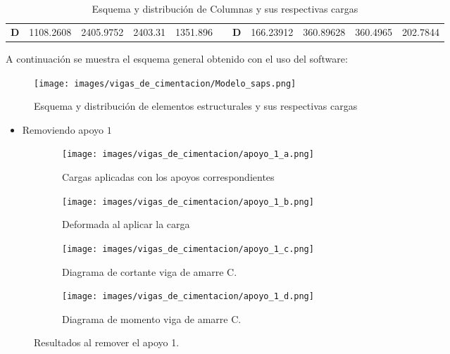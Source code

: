 \documentclass[12pt]{article}
\begin{document}
\begin{table}[H]
{\begin{tabular}{|c|r|r|r|r|r|c|r|r|r|r|}
\cline{1-5}\cline{7-11}    \rowcolor[rgb]{ 1,  .949,  .8} \textbf{D} & \cellcolor[rgb]{ 1,  1,  1}1108.2608 & \cellcolor[rgb]{ 1,  1,  1}2405.9752 & \cellcolor[rgb]{ 1,  1,  1}2403.31 & \cellcolor[rgb]{ 1,  1,  1}1351.896 & \cellcolor[rgb]{ 1,  1,  1} & \textbf{D} & \cellcolor[rgb]{ 1,  1,  1}166.23912 & \cellcolor[rgb]{ 1,  1,  1}360.89628 & \cellcolor[rgb]{ 1,  1,  1}360.4965 & \cellcolor[rgb]{ 1,  1,  1}202.7844 \bigstrut\\
\cline{1-5}\cline{7-11}    \end{tabular}}%
  \caption{Esquema y distribución de Columnas y sus respectivas cargas}
  \label{tab:Cargasa vigas amarre}%
\end{table}%

 A continuación se muestra el esquema general obtenido con el uso del software:
 \begin{figure}[H]
    \centering
    \texttt{[image: images/vigas\_de\_cimentacion/Modelo\_saps.png]}
    \caption{Esquema y distribución de elementos estructurales y sus respectivas cargas}
\end{figure}

\newpage
\begin{itemize}
    \item Removiendo apoyo $1$
\end{itemize}

\begin{figure}[H]
\begin{subfigure}{.5\textwidth}
  \centering
  \texttt{[image: images/vigas\_de\_cimentacion/apoyo\_1\_a.png]}  
  \caption{Cargas aplicadas con los apoyos correspondientes}
  \label{fig:Cargas removiendo AP1}
\end{subfigure}
\begin{subfigure}{.5\textwidth}
  \centering
  \texttt{[image: images/vigas\_de\_cimentacion/apoyo\_1\_b.png]}  
  \caption{Deformada al aplicar la carga}
  \label{fig:Deformada AP1}
\end{subfigure}

\begin{subfigure}{.5\textwidth}
  \centering
  \texttt{[image: images/vigas\_de\_cimentacion/apoyo\_1\_c.png]}  
  \caption{Diagrama de cortante viga de amarre C.}
  \label{fig:Cortante AP1}
\end{subfigure}
\begin{subfigure}{.5\textwidth}
  \centering
  \texttt{[image: images/vigas\_de\_cimentacion/apoyo\_1\_d.png]}  
  \caption{Diagrama de momento viga de amarre C.}
  \label{fig:Momento AP1}
\end{subfigure}
\caption{Resultados al remover el apoyo 1.}
\label{fig:R apoyo 1}
\end{figure}
\end{document}

